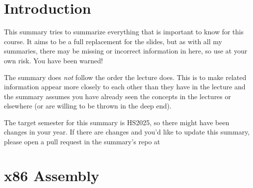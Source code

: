 \documentclass{article}
\begin{document}
\section{Introduction}
This summary tries to summarize everything that is important to know for this course.
It aims to be a full replacement for the slides, but as with all my summaries, there may be missing or incorrect information in here,
so use at your own risk. You have been warned!

The summary does \textit{not} follow the order the lecture does.
This is to make related information appear more closely to each other than they have in the lecture and the summary assumes you have already seen
the concepts in the lectures or elsewhere (or are willing to be thrown in the deep end).

The target semester for this summary is HS2025, so there might have been changes in your year.
If there are changes and you'd like to update this summary, please open a pull request in the summary's repo at

\begin{center}
\end{center}


\newpage
\section{x86 Assembly}




















\newpage
\end{document}
